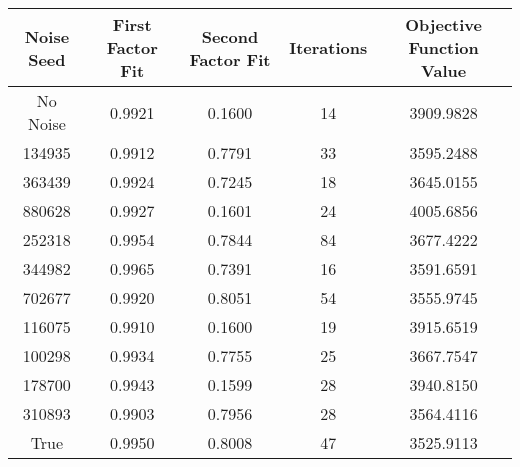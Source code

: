 \begin{tabular}{ccccc}
   
Noise Seed & First Factor Fit & Second Factor Fit & Iterations & Objective Function Value \\
 \hline
No Noise & 0.9921 & 0.1600 &    14 & 3909.9828 \\ 
  134935 & 0.9912 & 0.7791 &    33 & 3595.2488 \\ 
  363439 & 0.9924 & 0.7245 &    18 & 3645.0155 \\ 
  880628 & 0.9927 & 0.1601 &    24 & 4005.6856 \\ 
  252318 & 0.9954 & 0.7844 &    84 & 3677.4222 \\ 
  344982 & 0.9965 & 0.7391 &    16 & 3591.6591 \\ 
  702677 & 0.9920 & 0.8051 &    54 & 3555.9745 \\ 
  116075 & 0.9910 & 0.1600 &    19 & 3915.6519 \\ 
  100298 & 0.9934 & 0.7755 &    25 & 3667.7547 \\ 
  178700 & 0.9943 & 0.1599 &    28 & 3940.8150 \\ 
  310893 & 0.9903 & 0.7956 &    28 & 3564.4116 \\ 
  True & 0.9950 & 0.8008 &    47 & 3525.9113 \\ 
  \end{tabular}
